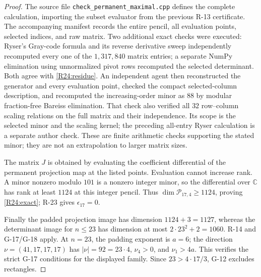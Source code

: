 \begin{proof}
The source file \texttt{check\_permanent\_maximal.cpp} defines the
complete calculation, importing the subset evaluator from the
previous R-13 certificate. The accompanying manifest records the
entire pencil, all evaluation points, selected indices, and raw
matrix. Two additional exact checks were executed: Ryser's
Gray-code formula and its reverse derivative sweep independently
recomputed every one of the $1{,}317{,}840$ matrix entries; a
separate NumPy elimination using unnormalized pivot rows recomputed
the selected determinant. Both agree with \eqref{R24:residue}.
An independent agent then reconstructed the generator and every
evaluation point, checked the compact selected-column description,
and recomputed the increasing-order minor as $88$ by modular
fraction-free Bareiss elimination. That check also verified all
$32$ row--column scaling relations on the full matrix and their
independence. Its scope is the selected minor and the scaling
kernel; the preceding all-entry Ryser calculation is a separate
author check.
These are finite arithmetic checks supporting the stated minor;
they are not an extrapolation to larger matrix sizes.

The matrix $J$ is obtained by evaluating the coefficient
differential of the permanent projection map at the listed points.
Evaluation cannot increase rank. A minor nonzero modulo $101$
is a nonzero integer minor, so the differential over $\mathbb C$
has rank at least $1124$ at this integer pencil. Thus
$\dim\mathcal P_{17,4}\geq1124$, proving
\eqref{R24:exact}; R-23 gives $\epsilon_{17}=0$.

Finally the padded projection image has dimension $1124+3=1127$,
whereas the determinant image for $n\leq23$ has dimension at most
$2\cdot23^2+2=1060$. R-14 and G-17/G-18 apply. At $n=23$,
the padding exponent is $a=6$; the direction
$\nu=(41,17,17,17)$ has $|\nu|=92=23\cdot4$,
$\nu_4>0$, and $\nu_1>4a$. This verifies the strict G-17
conditions for the displayed family. Since $23>4\cdot17/3$,
G-12 excludes rectangles.
\end{proof}

